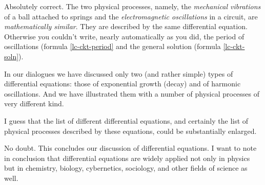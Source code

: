\athr Absolutely correct. The two physical processes, namely, the \emph{mechanical vibrations} of a ball attached to springs and the \emph{electromagnetic oscillations} in a circuit, are \emph{mathematically similar}. They are described by the same differential equation. Otherwise you couldn't write, nearly automatically as you did, the period of oscillations (formula \eqref{lc-ckt-period} and the general solution (formula \ref{lc-ckt-soln}).

In our dialogues we have discussed only two (and rather simple) types of differential equations: those of exponential growth (decay) and of harmonic oscillations. And we have illustrated them with a number of physical processes of very different kind.

\rdr I guess that the list of different differential equations, and certainly the list of physical processes described by these equations, could be substantially enlarged.

\athr No doubt. This concludes our discussion of differential equations. I want to note in conclusion that differential equations are widely applied not only in physics but in chemistry, biology, cybernetics, sociology, and other fields of science as well.